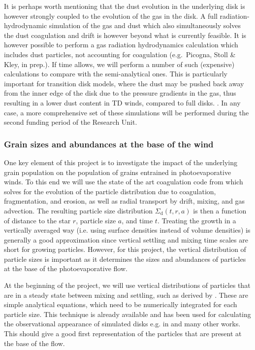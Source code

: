 \documentclass[10pt,fleqn,twoside]{article}
\begin{document}
It is perhaps worth mentioning that the dust evolution in the
underlying disk is however strongly coupled to the evolution of the gas
in the disk. A full radiation-hydrodynamic simulation of the gas and
dust which also simultaneously solves the dust coagulation and drift
is however beyond what is currently feasible. It is however possible
to perform a gas radiation hydrodynamics calculation which includes
dust particles, not accounting for coagulation (e.g.\ Picogna, Stoll \&
Kley,
in prep.). If time allows, we will perform a number of such
(expensive) calculations to compare with the semi-analytical
ones. This is particularly important for transition disk models, where
the dust may be pushed back away from the inner edge of the disk due
to the pressure gradients in the gas, thus resulting in a  lower dust
content in TD winds, compared to full disks. . In any case, a more
comprehensive set of these simulations will be performed during the
second funding period of the Research Unit.  

\subsubsection{Grain sizes and abundances at the base of the wind}

One key element of this project is to investigate the impact of the
underlying grain population on the population of grains entrained in
photoevaporative
winds. To this end we will use the state of the art coagulation code
from \citet{2010A&A...513A..79B} which solves for the evolution of the
particle distribution due to coagulation, fragmentation, and erosion,
as well as radial transport by drift, mixing, and gas advection. The
resulting particle size distribution $\Sigma_\mathrm{d}(t,r,a)$ is
then a function of distance to the star $r$, particle size $a$, and
time $t$. Treating the growth in a vertically averaged way (i.e.
using surface densities instead of volume densities) is generally a
good approximation since vertical settling and mixing time scales are
short for growing particles. However, for this project, the vertical
distribution of particle sizes is important as it determines the sizes
and abundances of particles at the base of the photoevaporative flow.

At the beginning of the project, we will use vertical distributions of
particles that are in a steady state between mixing and settling, such
as derived by \citet{2009A&A...496..597F}. These are simple analytical
equations, which need to be numerically integrated for each particle
size. This technique is already available and has been used for
calculating the observational appearance of simulated disks e.g.
in \citet{2015ApJ...813L..14B} and many other works. This should give
a good first representation of the particles that are present at the
base of the flow.
\end{document}
